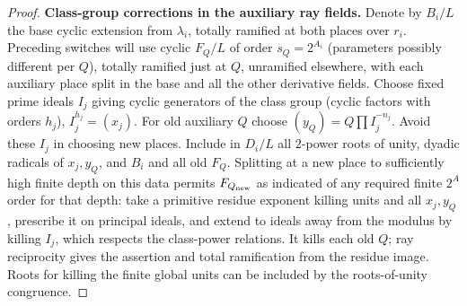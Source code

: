 \begin{proof}
\par\smallskip\noindent\textbf{Class-group corrections in the auxiliary ray fields.}\enspace
Denote by \(B_i/L\) the base cyclic extension from \(\lambda_i\), totally ramified at both
places over \(r_i\). Preceding switches will use cyclic \(F_Q/L\) of order \(s_Q=2^{A_i}\)
(parameters possibly different per \(Q\)), totally ramified just at \(Q\), unramified
elsewhere, with each auxiliary place split in the base and all the other derivative fields.
Choose fixed prime ideals \(I_j\) giving cyclic generators of the class group (cyclic factors
with orders \(h_j\)), \(I_j^{h_j}=(x_j)\). For old auxiliary \(Q\) choose \((y_Q)=Q\prod
I_j^{-n_j}\). Avoid these \(I_j\) in choosing new places. Include in \(D_i/L\) all \(2\)-power
roots of unity, dyadic radicals of \(x_j,y_Q\), and \(B_i\) and all old \(F_Q\). Splitting at
a new place to sufficiently high finite depth on this data permits \(F_{Q_{\rm new}}\) as
indicated of any required finite \(2^A\) order for that depth: take a primitive residue
exponent killing units and all \(x_j,y_Q\), prescribe it on principal ideals, and extend to
ideals away from the modulus by killing \(I_j\), which respects the class-power relations. It
kills each old \(Q\); ray reciprocity gives the assertion and total ramification from the
residue image. Roots for killing the finite global units can be included by the roots-of-unity
congruence.


\end{proof}
